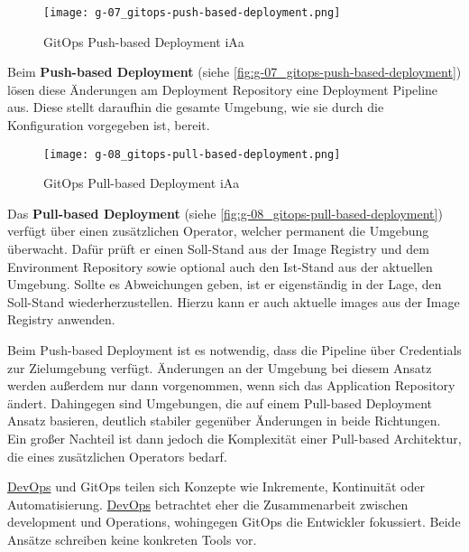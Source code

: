 \begin{figure}[h]
    \centering
    \texttt{[image: g-07\_gitops-push-based-deployment.png]}
    \caption{GitOps Push-based Deployment \acrshort{iAa} \citeauthor{109:GitOps}}
    \label{fig:g-07_gitops-push-based-deployment}
\end{figure}

Beim \textbf{Push-based Deployment} (siehe \autoref{fig:g-07_gitops-push-based-deployment}) lösen diese Änderungen am Deployment Repository eine Deployment Pipeline aus. Diese stellt daraufhin die gesamte Umgebung, wie sie durch die Konfiguration vorgegeben ist, bereit. \cite{109:GitOps}

\begin{figure}[h]
    \centering
    \texttt{[image: g-08\_gitops-pull-based-deployment.png]}
    \caption{GitOps Pull-based Deployment \acrshort{iAa} \citeauthor{109:GitOps}}
    \label{fig:g-08_gitops-pull-based-deployment}
\end{figure}

Das \textbf{Pull-based Deployment} (siehe \autoref{fig:g-08_gitops-pull-based-deployment}) verfügt über einen zusätzlichen Operator, welcher permanent die Umgebung überwacht. Dafür prüft er einen Soll-Stand aus der Image Registry und dem Environment Repository sowie optional auch den Ist-Stand aus der aktuellen Umgebung. Sollte es Abweichungen geben, ist er eigenständig in der Lage, den Soll-Stand wiederherzustellen. Hierzu kann er auch aktuelle \Glspl{image} aus der Image Registry anwenden. \cite{109:GitOps}

Beim Push-based Deployment ist es notwendig, dass die Pipeline über Credentials zur Zielumgebung verfügt. Änderungen an der Umgebung bei diesem Ansatz werden außerdem nur dann vorgenommen, wenn sich das Application Repository ändert. Dahingegen sind Umgebungen, die auf einem Pull-based Deployment Ansatz basieren, deutlich stabiler gegenüber Änderungen in beide Richtungen. Ein großer Nachteil ist dann jedoch die Komplexität einer Pull-based Architektur, die eines zusätzlichen Operators bedarf. \cite{109:GitOps}

\hyperref[sec:03-01_devops]{DevOps} und GitOps teilen sich Konzepte wie Inkremente, Kontinuität oder Automatisierung. \hyperref[sec:03-01_devops]{DevOps} betrachtet eher die Zusammenarbeit zwischen \Gls{development} und Operations, wohingegen GitOps die Entwickler fokussiert. \cite{009:GitOps-Evolution-of-DevOps} Beide Ansätze schreiben keine konkreten Tools vor.
